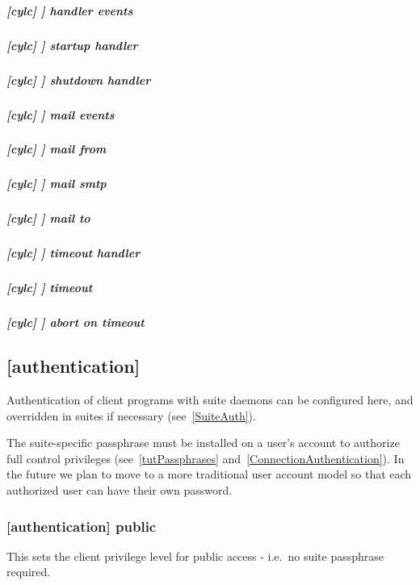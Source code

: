 \subparagraph[handler events]{[cylc] \textrightarrow [[event hooks]] \textrightarrow handler events}

\subparagraph[startup handler]{[cylc] \textrightarrow [[event hooks]] \textrightarrow startup handler}

\subparagraph[shutdown handler]{[cylc] \textrightarrow [[event hooks]] \textrightarrow shutdown handler}

\subparagraph[mail events]{[cylc] \textrightarrow [[event hooks]] \textrightarrow mail events}

\subparagraph[mail from]{[cylc] \textrightarrow [[event hooks]] \textrightarrow mail from}

\subparagraph[mail smtp]{[cylc] \textrightarrow [[event hooks]] \textrightarrow mail smtp}

\subparagraph[mail to]{[cylc] \textrightarrow [[event hooks]] \textrightarrow mail to}

\subparagraph[timeout handler]{[cylc] \textrightarrow [[event hooks]] \textrightarrow timeout handler}

\subparagraph[timeout]{[cylc] \textrightarrow [[event hooks]] \textrightarrow timeout}

\subparagraph[abort on timeout]{[cylc] \textrightarrow [[event hooks]] \textrightarrow abort on timeout}

\subsection{[authentication]}
\label{GlobalAuth}

Authentication of client programs with suite daemons can be configured here, and
overridden in suites if necessary (see~\ref{SuiteAuth}).

The suite-specific passphrase must be installed on a user's account to
authorize full control privileges (see~\ref{tutPassphrases}
and~\ref{ConnectionAuthentication}). In the future we plan to move to a more
traditional user account model so that each authorized user can have their own
password.

\subsubsection[public]{[authentication] \textrightarrow public}

This sets the client privilege level for public access - i.e.\ no suite passphrase
required.

